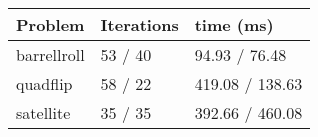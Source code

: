 \begin{tabular}{lll}
\toprule 
Problem & Iterations & time (ms) \\
\midrule 
barrellroll & 53 / 40 & 94.93 / 76.48 \\
quadflip & 58 / 22 & 419.08 / 138.63 \\
satellite & 35 / 35 & 392.66 / 460.08 \\
\bottomrule 
\end{tabular}
